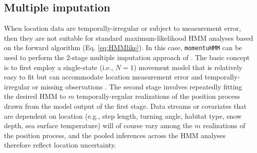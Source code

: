 \documentclass[12pt]{article}\usepackage[]{graphicx}\usepackage[]{xcolor}
\begin{document}
\subsection{Multiple imputation}
\label{sec:mi}
When location data are temporally-irregular or subject to measurement error, then they are not suitable for standard maximum-likelihood HMM analyses based on the forward algorithm (Eq. \ref{eq:HMMlike}). In this case, \verb|momentuHMM| can be used to perform the 2-stage multiple imputation approach of \cite{McClintock2017}. The basic concept is to first employ a single-state (i.e., $N=1$) movement model that is relatively easy to fit but can accommodate location measurement error and temporally-irregular or missing observations \citep[e.g.][]{JohnsonEtAl2008}. The second stage involves repeatedly fitting the desired HMM to $m$ temporally-regular realizations of the position process drawn from the model output of the first stage.  Data streams or covariates that are dependent on location (e.g., step length, turning angle, habitat type, snow depth, sea surface temperature) will of course vary among the $m$ realizations of the position process, and the pooled inferences across the HMM analyses therefore reflect location uncertainty.  
\end{document}
